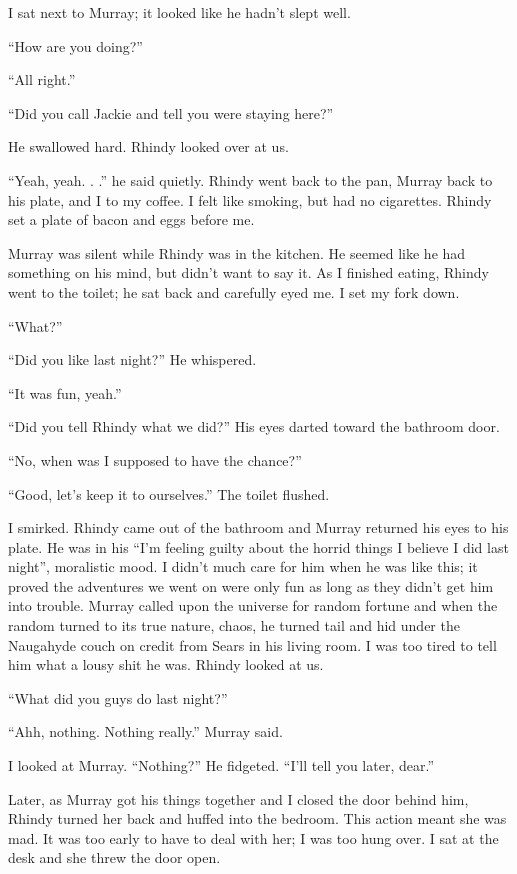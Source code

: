 I sat next to Murray; it looked like he hadn't slept well.

``How are you doing?''

``All right.''

``Did you call Jackie and tell you were staying here?''

He swallowed hard. Rhindy looked over at us.

``Yeah, yeah. . .'' he said quietly. Rhindy went back to the pan, Murray
back to his plate, and I to my coffee. I felt like smoking, but had no
cigarettes. Rhindy set a plate of bacon and eggs before me.

Murray was silent while Rhindy was in the kitchen. He seemed like he had
something on his mind, but didn't want to say it. As I finished eating,
Rhindy went to the toilet; he sat back and carefully eyed me. I set my
fork down.

``What?''

``Did you like last night?'' He whispered.

``It was fun, yeah.''

``Did you tell Rhindy what we did?'' His eyes darted toward the bathroom
door.

``No, when was I supposed to have the chance?''

``Good, let's keep it to ourselves.'' The toilet flushed.

I smirked. Rhindy came out of the bathroom and Murray returned his eyes
to his plate. He was in his ``I'm feeling guilty about the horrid things
I believe I did last night'', moralistic mood. I didn't much care for
him when he was like this; it proved the adventures we went on were only
fun as long as they didn't get him into trouble. Murray called upon the
universe for random fortune and when the random turned to its true
nature, chaos, he turned tail and hid under the Naugahyde couch on
credit from Sears in his living room. I was too tired to tell him what a
lousy shit he was. Rhindy looked at us.

``What did you guys do last night?''

``Ahh, nothing. Nothing really.'' Murray said.

I looked at Murray. ``Nothing?'' He fidgeted. ``I'll tell you later,
dear.''

Later, as Murray got his things together and I closed the door behind
him, Rhindy turned her back and huffed into the bedroom. This action
meant she was mad. It was too early to have to deal with her; I was too
hung over. I sat at the desk and she threw the door open.

